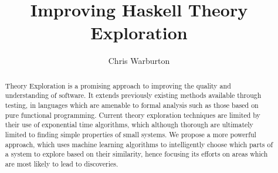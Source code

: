 \documentclass[]{article}
\begin{document}
\pagestyle{headings}  %

\title{Improving Haskell Theory Exploration}

\author{Chris Warburton}


\maketitle              %

\begin{abstract}
Theory Exploration is a promising approach to improving the quality and understanding of software. It extends previously existing methods available through testing, in languages which are amenable to formal analysis such as those based on pure functional programming. Current theory exploration techniques are limited by their use of exponential time algorithms, which although thorough are ultimately limited to finding simple properties of small systems. We propose a more powerful approach, which uses machine learning algorithms to intelligently choose which parts of a system to explore based on their similarity, hence focusing its efforts on areas which are most likely to lead to discoveries.

\end{abstract}








\iffalse TODO: Section that brings back ML discussion to TE is missing \fi



\end{document}
